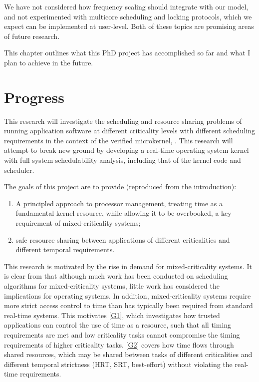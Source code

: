 We have not considered how frequency scaling should integrate with our model, and not experimented
with multicore scheduling and locking protocols, which we expect can be implemented at user-level.
Both of these topics are promising areas of future research.



This chapter outlines what this PhD project has accomplished so far and what I plan to achieve in the future.

\section{Progress}

This research will investigate the scheduling and resource sharing problems of running application software at different criticality levels with different scheduling requirements in the context of the verified microkernel, \selfour.
This research will attempt to break new ground by developing a real-time operating system kernel with full system schedulability analysis, including that of the kernel code and scheduler.

The goals of this project are to provide (reproduced from the introduction):

\begin{enumerate}[label=\textbf{G\arabic*}]
  \item \label{G1} A principled approach to processor management, treating time as a fundamental kernel resource, while allowing it to be overbooked, a key requirement of mixed-criticality systems;
  \item \label{G2} safe resource sharing between applications of different criticalities and different temporal requirements.
\end{enumerate}

This research is motivated by the rise in demand for mixed-criticality systems.
It is clear from  that although much work has been conducted on scheduling algorithms for mixed-criticality systems, little work has considered the implications for operating systems.
In addition, mixed-criticality systems require more strict access control to time than has typically been required from standard real-time systems.
This motivates \ref{G1}, which investigates how trusted applications can control the use of time as a resource, such that all timing requirements are met and low criticality tasks cannot compromise the timing requirements of higher criticality tasks.
\ref{G2} covers how time flows through shared resources, which may be shared between tasks of
different criticalities and different temporal strictness (\gls{HRT}, \gls{SRT}, best-effort) without violating the real-time requirements.

